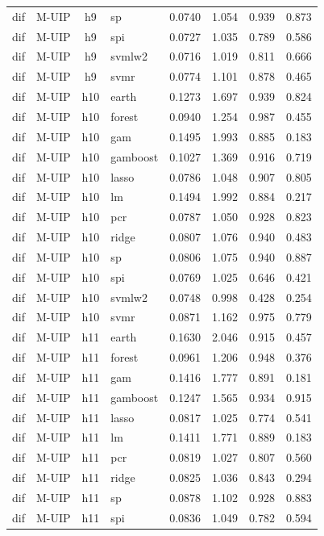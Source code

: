 \begin{ThreePartTable}
\begin{longtable}[t]{llclcccc}
dif & M-UIP & h9 & sp & 0.0740 & 1.054 & 0.939 & 0.873\\
dif & M-UIP & h9 & spi & 0.0727 & 1.035 & 0.789 & 0.586\\
dif & M-UIP & h9 & svmlw2 & 0.0716 & 1.019 & 0.811 & 0.666\\
dif & M-UIP & h9 & svmr & 0.0774 & 1.101 & 0.878 & 0.465\\
\addlinespace
dif & M-UIP & h10 & earth & 0.1273 & 1.697 & 0.939 & 0.824\\
dif & M-UIP & h10 & forest & 0.0940 & 1.254 & 0.987 & 0.455\\
dif & M-UIP & h10 & gam & 0.1495 & 1.993 & 0.885 & 0.183\\
dif & M-UIP & h10 & gamboost & 0.1027 & 1.369 & 0.916 & 0.719\\
dif & M-UIP & h10 & lasso & 0.0786 & 1.048 & 0.907 & 0.805\\
dif & M-UIP & h10 & lm & 0.1494 & 1.992 & 0.884 & 0.217\\
dif & M-UIP & h10 & pcr & 0.0787 & 1.050 & 0.928 & 0.823\\
dif & M-UIP & h10 & ridge & 0.0807 & 1.076 & 0.940 & 0.483\\
dif & M-UIP & h10 & sp & 0.0806 & 1.075 & 0.940 & 0.887\\
dif & M-UIP & h10 & spi & 0.0769 & 1.025 & 0.646 & 0.421\\
dif & M-UIP & h10 & svmlw2 & 0.0748 & 0.998 & 0.428 & 0.254\\
dif & M-UIP & h10 & svmr & 0.0871 & 1.162 & 0.975 & 0.779\\
\addlinespace
dif & M-UIP & h11 & earth & 0.1630 & 2.046 & 0.915 & 0.457\\
dif & M-UIP & h11 & forest & 0.0961 & 1.206 & 0.948 & 0.376\\
dif & M-UIP & h11 & gam & 0.1416 & 1.777 & 0.891 & 0.181\\
dif & M-UIP & h11 & gamboost & 0.1247 & 1.565 & 0.934 & 0.915\\
dif & M-UIP & h11 & lasso & 0.0817 & 1.025 & 0.774 & 0.541\\
dif & M-UIP & h11 & lm & 0.1411 & 1.771 & 0.889 & 0.183\\
dif & M-UIP & h11 & pcr & 0.0819 & 1.027 & 0.807 & 0.560\\
dif & M-UIP & h11 & ridge & 0.0825 & 1.036 & 0.843 & 0.294\\
dif & M-UIP & h11 & sp & 0.0878 & 1.102 & 0.928 & 0.883\\
dif & M-UIP & h11 & spi & 0.0836 & 1.049 & 0.782 & 0.594\\

\end{longtable}
\end{ThreePartTable}
